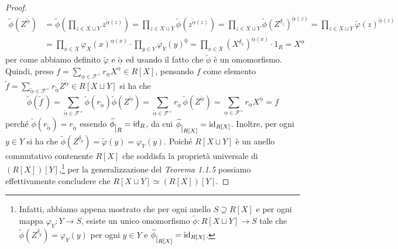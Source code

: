 \documentclass{article}
\theoremstyle{definition}
\begin{document}
\begin{proof}
{\setlength{\belowdisplayskip}{2.5pt} \setlength{\abovedisplayskip}{5pt}\begin{align*} \widetilde{\phi}(Z^{\widetilde{\underline{\alpha}}}) &= \widetilde{\phi}\left( \prod\limits_{z\in X\sqcup Y} z^{\widetilde{\underline{\alpha}}(z)} \right) = \prod\limits_{z\in X\sqcup Y} \widetilde{\phi}\left(z^{\widetilde{\underline{\alpha}}(z)}\right) = \prod\limits_{z\in X\sqcup Y} \widetilde{\phi}\left(Z^{\underline{\delta}_z}\right)^{\widetilde{\underline{\alpha}}(z)} = \prod\limits_{z\in X\sqcup Y} \widetilde{\varphi}(z)^{\widetilde{\underline{\alpha}}(z)} \\ &= \prod\limits_{x\in X} \varphi_X(x)^{\underline{\alpha}(x)}\cdot \prod\limits_{y\in Y} \varphi_Y(y)^{\underline{0}} = \prod\limits_{x\in X} (X^{\underline{\delta}_x})^{\underline{\alpha}(x)}\cdot 1_R = X^{\underline{\alpha}} \end{align*}}\noindent per come abbiamo definito $\widetilde{\varphi}$ e $\underline{\widetilde{\alpha}}$ ed usando il fatto che $\widetilde{\phi}$ è un omomorfismo. Quindi, preso $f=\sum\limits_{\underline{\alpha}\in \mathcal{F}^{\times}} r_{\underline{\alpha}} X^{\underline{\alpha}}\in R[X]$, pensando $f$ come elemento $\widetilde{f}=\sum\limits_{\widetilde{\underline{\alpha}}\in \mathcal{F}^{\times}} r_{\widetilde{\underline{\alpha}}} Z^{\widetilde{\underline{\alpha}}}\in R[X\sqcup Y]$ si ha che \[ \widetilde{\phi}(\widetilde{f}\,) = \sum\limits_{\widetilde{\underline{\alpha}}\in \mathcal{F}^{\times}} \widetilde{\phi}(r_{\widetilde{\underline{\alpha}}}) \widetilde{\phi}(Z^{\widetilde{\underline{\alpha}}}) = \sum\limits_{\widetilde{\underline{\alpha}}\in \mathcal{F}^{\times}} r_{\widetilde{\underline{\alpha}}}\,\widetilde{\phi}(Z^{\widetilde{\underline{\alpha}}}) = \sum\limits_{\underline{\alpha}\in \mathcal{F}^{\times}} r_{\underline{\alpha}} X^{\underline{\alpha}} = f \] perché $\widetilde{\phi}(r_{\widetilde{\underline{\alpha}}})=r_{\widetilde{\underline{\alpha}}}$ essendo $\widetilde{\phi} \raisebox{-.5em}{$\vert_{R}$}= \operatorname{id}_R$, da cui $\widetilde{\phi} \raisebox{-.5em}{$\vert_{R[X]}$}=\operatorname{id}_{R[X]}$. Inoltre, per ogni $y\in Y$ si ha che $\widetilde{\phi}(Z^{\underline{\delta}_y})=\widetilde{\varphi}(y)=\varphi_Y(y)$. Poiché $R[X\sqcup Y]$ è un anello commutativo contenente $R[X]$ che soddisfa la proprietà universale di $(R[X])[Y]$,\footnote{Infatti, abbiamo appena mostrato che per ogni anello $S\supseteq R[X]$ e per ogni mappa $\varphi_Y\colon Y\to S$, esiste un unico omomorfismo $\widetilde{\phi}\colon R[X\sqcup Y]\to S$ tale che $\widetilde{\phi}(Z^{\underline{\delta}_y})=\varphi_Y(y)$ per ogni $y\in Y$ e $\widetilde{\phi} \raisebox{-.5em}{$\vert_{R[X]}$}=\operatorname{id}_{R[X]}$.} per la generalizzazione del \emph{Teorema 1.1.5} possiamo effettivamente concludere che $R[X \sqcup Y]\simeq (R[X])[Y]$.
\end{proof}
\clearpage
\end{document}

